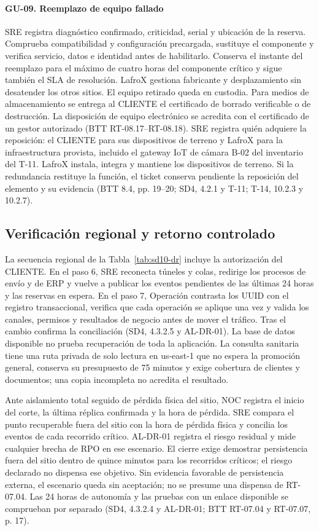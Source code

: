 \paragraph*{GU-09. Reemplazo de equipo fallado}
SRE registra diagnóstico confirmado, criticidad, serial y ubicación de la reserva. Comprueba compatibilidad y configuración precargada, sustituye el componente y verifica servicio, datos e identidad antes de habilitarlo. Conserva el instante del reemplazo para el máximo de cuatro horas del componente crítico y sigue también el SLA de resolución. LafroX gestiona fabricante y desplazamiento sin desatender los otros sitios. El equipo retirado queda en custodia. Para medios de almacenamiento se entrega al CLIENTE el certificado de borrado verificable o de destrucción. La disposición de equipo electrónico se acredita con el certificado de un gestor autorizado (BTT RT-08.17--RT-08.18). SRE registra quién adquiere la reposición: el CLIENTE para sus dispositivos de terreno y LafroX para la infraestructura provista, incluido el gateway IoT de cámara B-02 del inventario del T-11. LafroX instala, integra y mantiene los dispositivos de terreno. Si la redundancia restituye la función, el ticket conserva pendiente la reposición del elemento y su evidencia (BTT 8.4, pp. 19--20; SD4, 4.2.1 y T-11; T-14, 10.2.3 y 10.2.7).

\subsection*{Verificación regional y retorno controlado}
La secuencia regional de la Tabla~\ref{tab:sd10-dr} incluye la autorización del CLIENTE. En el paso 6, SRE reconecta túneles y colas, redirige los procesos de envío y de ERP y vuelve a publicar los eventos pendientes de las últimas 24 horas y las reservas en espera. En el paso 7, Operación contrasta los UUID con el registro transaccional, verifica que cada operación se aplique una vez y valida los canales, permisos y resultados de negocio antes de mover el tráfico. Tras el cambio confirma la conciliación (SD4, 4.3.2.5 y AL-DR-01). La base de datos disponible no prueba recuperación de toda la aplicación. La consulta sanitaria tiene una ruta privada de solo lectura en us-east-1 que no espera la promoción general, conserva su presupuesto de 75 minutos y exige cobertura de clientes y documentos; una copia incompleta no acredita el resultado.

Ante aislamiento total seguido de pérdida física del sitio, NOC registra el inicio del corte, la última réplica confirmada y la hora de pérdida. SRE compara el punto recuperable fuera del sitio con la hora de pérdida física y concilia los eventos de cada recorrido crítico. AL-DR-01 registra el riesgo residual y mide cualquier brecha de RPO en ese escenario. El cierre exige demostrar persistencia fuera del sitio dentro de quince minutos para los recorridos críticos; el riesgo declarado no dispensa ese objetivo. Sin evidencia favorable de persistencia externa, el escenario queda sin aceptación; no se presume una dispensa de RT-07.04. Las 24 horas de autonomía y las pruebas con un enlace disponible se comprueban por separado (SD4, 4.3.2.4 y AL-DR-01; BTT RT-07.04 y RT-07.07, p. 17).

